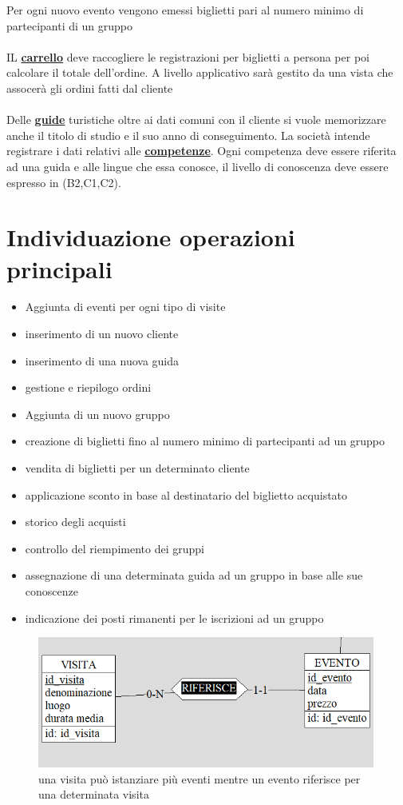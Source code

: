 \documentclass[a4paper,12pt]{report}
\begin{document}
Per ogni nuovo evento vengono emessi biglietti pari al numero minimo di partecipanti di un gruppo\\\\
IL \textbf{\underline{carrello}} deve raccogliere le registrazioni per biglietti a persona per poi calcolare
il totale dell'ordine. A livello applicativo sarà gestito da una vista che assocerà gli ordini fatti dal cliente \\\\
Delle \textbf{\underline{guide}} turistiche oltre ai dati comuni con il cliente si vuole memorizzare
anche il titolo di studio e il suo anno di conseguimento. La società intende registrare i dati relativi
alle \textbf{\underline{competenze}}. Ogni competenza deve essere riferita ad una guida e alle lingue che essa conosce,
il livello di conoscenza deve essere espresso in (B2,C1,C2).

\section*{Individuazione operazioni principali}
\begin{itemize}
	\item Aggiunta di eventi per ogni tipo di visite
	\item inserimento di un nuovo cliente
	\item inserimento di una nuova guida
	\item gestione e riepilogo ordini
	\item Aggiunta di un nuovo gruppo
	\item creazione di biglietti fino al numero minimo di partecipanti ad un gruppo
	\item vendita di biglietti per un determinato cliente
	\item applicazione sconto in base al destinatario del biglietto acquistato
	\item storico degli acquisti
	\item controllo del riempimento dei gruppi
	\item assegnazione di una determinata guida ad un gruppo in base alle sue conoscenze
	\item indicazione dei posti rimanenti per le iscrizioni ad un gruppo
\end{itemize}




\begin{figure}[H]
	\centering
	\includegraphics[width=0.99\textwidth]{visita-evento.png}
	\caption[]{una visita può istanziare più eventi mentre
		un evento riferisce per una determinata visita}
\end{figure}
\end{document}
